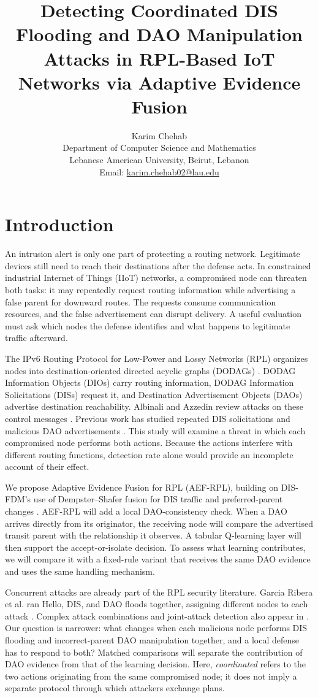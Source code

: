 \documentclass[journal]{IEEEtran}
\title{Detecting Coordinated DIS Flooding and DAO Manipulation Attacks in RPL-Based IoT Networks via Adaptive Evidence Fusion}
\author{Karim Chehab\\[0.5ex]
\normalsize Department of Computer Science and Mathematics\\
\normalsize Lebanese American University, Beirut, Lebanon\\
\normalsize Email: \href{mailto:karim.chehab02@lau.edu}{karim.chehab02@lau.edu}}
\date{}
\begin{document}
\maketitle

\section{Introduction}\label{sec:introduction}
An intrusion alert is only one part of protecting a routing network. Legitimate devices still need to reach their destinations after the defense acts. In constrained industrial Internet of Things (IIoT) networks, a compromised node can threaten both tasks: it may repeatedly request routing information while advertising a false parent for downward routes. The requests consume communication resources, and the false advertisement can disrupt delivery. A useful evaluation must ask which nodes the defense identifies and what happens to legitimate traffic afterward.

The IPv6 Routing Protocol for Low-Power and Lossy Networks (RPL) organizes nodes into destination-oriented directed acyclic graphs (DODAGs) \cite{rfc6550}. DODAG Information Objects (DIOs) carry routing information, DODAG Information Solicitations (DISs) request it, and Destination Advertisement Objects (DAOs) advertise destination reachability. Albinali and Azzedin review attacks on these control messages \cite{albinali2024}. Previous work has studied repeated DIS solicitations \cite{rajasekar2022,vermaranga2020,medjek2021} and malicious DAO advertisements \cite{pu2018,limsd2024}. This study will examine a threat in which each compromised node performs both actions. Because the actions interfere with different routing functions, detection rate alone would provide an incomplete account of their effect.

We propose Adaptive Evidence Fusion for RPL (AEF-RPL), building on DIS-FDM's use of Dempster--Shafer fusion for DIS traffic and preferred-parent changes \cite{prajisha2025}. AEF-RPL will add a local DAO-consistency check. When a DAO arrives directly from its originator, the receiving node will compare the advertised transit parent with the relationship it observes. A tabular Q-learning layer will then support the accept-or-isolate decision. To assess what learning contributes, we will compare it with a fixed-rule variant that receives the same DAO evidence and uses the same handling mechanism.

Concurrent attacks are already part of the RPL security literature. Garcia Ribera et al. ran Hello, DIS, and DAO floods together, assigning different nodes to each attack \cite{garciaribera2022}. Complex attack combinations and joint-attack detection also appear in \cite{alsukayti2023,de2rarpl2024,abdulkareem2024}. Our question is narrower: what changes when each malicious node performs DIS flooding and incorrect-parent DAO manipulation together, and a local defense has to respond to both? Matched comparisons will separate the contribution of DAO evidence from that of the learning decision. Here, \emph{coordinated} refers to the two actions originating from the same compromised node; it does not imply a separate protocol through which attackers exchange plans.
\end{document}
